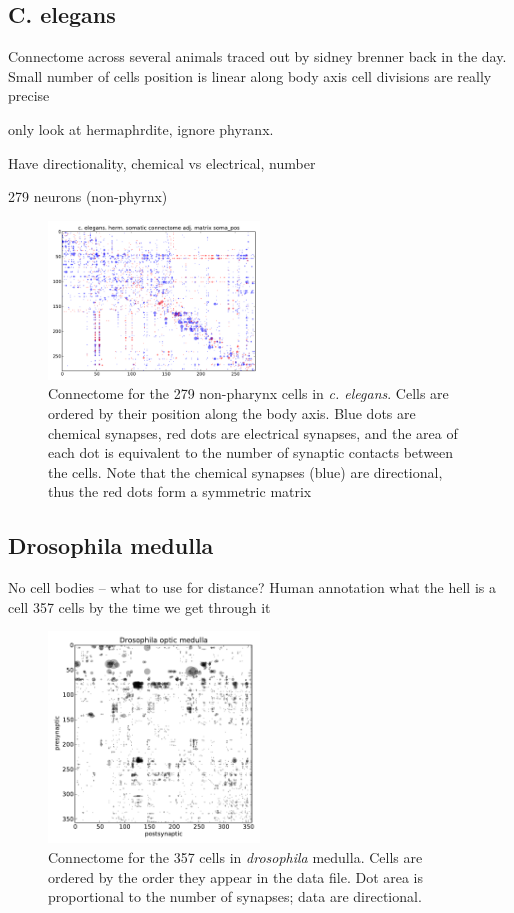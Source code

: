 \documentclass{article}
\begin{document}
\subsection{C. elegans}
Connectome across several animals traced out by sidney brenner back in the day.
Small number of cells
position is linear along body axis
cell divisions are really precise

only look at hermaphrdite, ignore phyranx. 

Have directionality, chemical vs electrical, number

279 neurons (non-phyrnx) 


\begin{figure}
  \centering 
  \includegraphics[width=0.5\textwidth]{celegans/data.pos.pdf}
  \caption{Connectome for the 279 non-pharynx cells in \textit{c. elegans}. Cells are ordered by their position along the body axis. Blue dots are chemical synapses, red dots are electrical synapses, and the area of each dot is equivalent to the number of synaptic contacts between the cells. Note that the chemical synapses (blue) are directional, thus the red dots form a symmetric matrix}
  \label{fig:celegans_adj}
\end{figure}


\subsection{Drosophila medulla}
\autocite{Takemura2013}
No cell bodies -- what to use for distance? 
Human annotation
what the hell is a cell
357 cells by the time we get through it

\begin{figure}
  \centering 
  \includegraphics[width=0.5\textwidth]{drosophila/adj_comp.pdf}
  \caption{Connectome for the 357 cells in \textit{drosophila} medulla. Cells are ordered by the order they appear in the data file. Dot area is proportional to the number of synapses; data are directional.}
  \label{fig:drosophila_adj}
\end{figure}
\end{document}
